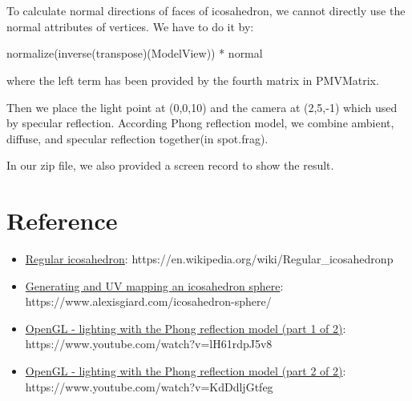\documentclass{article}
\begin{document}
\section{}

To calculate normal directions of faces of icosahedron, we cannot directly use the normal attributes of vertices. We have to do it by:
\begin{center}
  normalize(inverse(transpose)(ModelView)) * normal
\end{center}
where the left term has been provided by the fourth matrix in PMVMatrix.

Then we place the light point at (0,0,10) and the camera at (2,5,-1) which used by specular reflection. According Phong reflection model, we combine ambient, diffuse, and specular reflection together(in spot.frag).

In our zip file, we also provided a screen record to show the result.

\section{Reference}
\begin{itemize}
  \item \href{https://en.wikipedia.org/wiki/Regular_icosahedron}{Regular icosahedron}: https://en.wikipedia.org/wiki/Regular\_icosahedronp
  \item \href{https://www.alexisgiard.com/icosahedron-sphere/}{Generating and UV mapping an icosahedron sphere}: https://www.alexisgiard.com/icosahedron-sphere/
  \item \href{https://www.youtube.com/watch?v=lH61rdpJ5v8}{OpenGL - lighting with the Phong reflection model (part 1 of 2)}: https://www.youtube.com/watch?v=lH61rdpJ5v8
  \item \href{https://www.youtube.com/watch?v=KdDdljGtfeg}{OpenGL - lighting with the Phong reflection model (part 2 of 2)}: https://www.youtube.com/watch?v=KdDdljGtfeg
\end{itemize}
\end{document}
